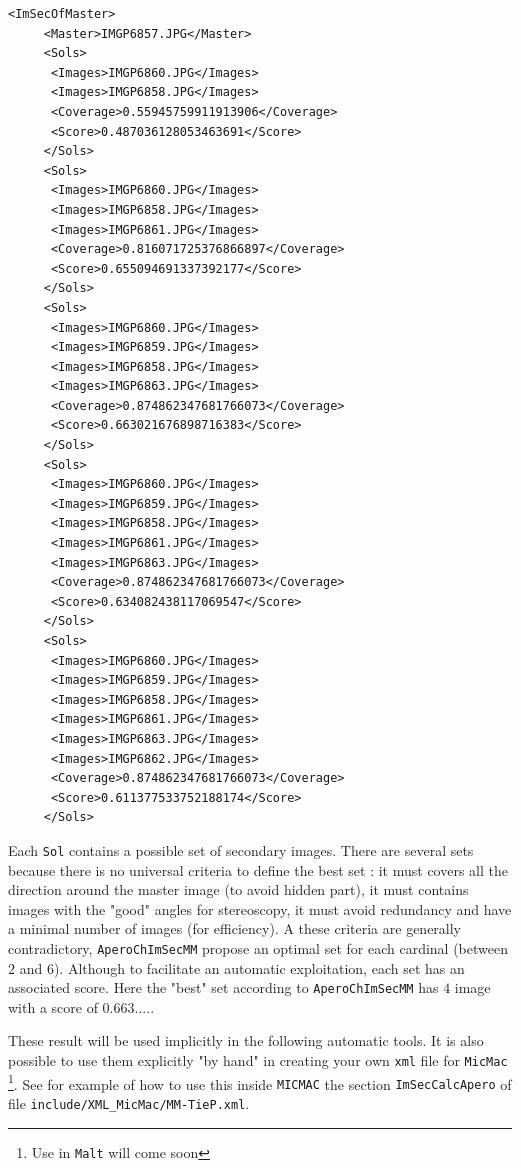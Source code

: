{\small
\begin{verbatim}
<ImSecOfMaster>
     <Master>IMGP6857.JPG</Master>
     <Sols>
	  <Images>IMGP6860.JPG</Images>
	  <Images>IMGP6858.JPG</Images>
	  <Coverage>0.55945759911913906</Coverage>
	  <Score>0.487036128053463691</Score>
     </Sols>
     <Sols>
	  <Images>IMGP6860.JPG</Images>
	  <Images>IMGP6858.JPG</Images>
	  <Images>IMGP6861.JPG</Images>
	  <Coverage>0.816071725376866897</Coverage>
	  <Score>0.655094691337392177</Score>
     </Sols>
     <Sols>
	  <Images>IMGP6860.JPG</Images>
	  <Images>IMGP6859.JPG</Images>
	  <Images>IMGP6858.JPG</Images>
	  <Images>IMGP6863.JPG</Images>
	  <Coverage>0.874862347681766073</Coverage>
	  <Score>0.663021676898716383</Score>
     </Sols>
     <Sols>
	  <Images>IMGP6860.JPG</Images>
	  <Images>IMGP6859.JPG</Images>
	  <Images>IMGP6858.JPG</Images>
	  <Images>IMGP6861.JPG</Images>
	  <Images>IMGP6863.JPG</Images>
	  <Coverage>0.874862347681766073</Coverage>
	  <Score>0.634082438117069547</Score>
     </Sols>
     <Sols>
	  <Images>IMGP6860.JPG</Images>
	  <Images>IMGP6859.JPG</Images>
	  <Images>IMGP6858.JPG</Images>
	  <Images>IMGP6861.JPG</Images>
	  <Images>IMGP6863.JPG</Images>
	  <Images>IMGP6862.JPG</Images>
	  <Coverage>0.874862347681766073</Coverage>
	  <Score>0.611377533752188174</Score>
     </Sols>
\end{verbatim}
}

Each {\tt Sol} contains a possible set of secondary images. There are several sets because there is no universal
criteria to define the best set : it must covers  all the direction around the master image
(to avoid hidden part), it must contains images with the "good" angles for stereoscopy, it
must avoid redundancy and have a minimal number of images (for efficiency). A these criteria
are generally contradictory, {\tt AperoChImSecMM} propose an optimal set for each cardinal
(between $2$ and $6$). Although to facilitate an automatic exploitation, each set has an
associated score. Here the "best" set according to {\tt AperoChImSecMM} has $4$ image with
a score of $0.663....$.

These result will be used implicitly in the following automatic tools. It is also possible to use them explicitly
"by hand" in creating your own {\tt xml} file for {\tt MicMac} \footnote{Use in {\tt Malt} will come soon}.
See for example of how to use this inside {\tt MICMAC} the section {\tt ImSecCalcApero} of file
{\tt include/XML\_MicMac/MM-TieP.xml}.



